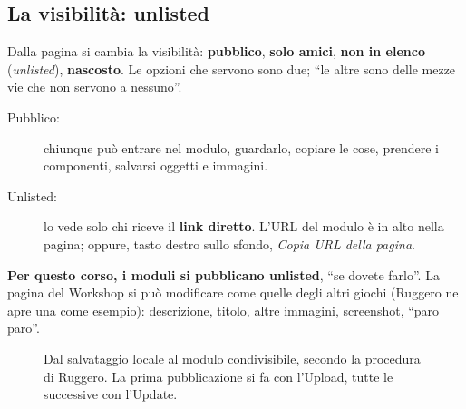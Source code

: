 \subsection{La visibilità: unlisted}
\label{a8:sec:visibilita}

Dalla pagina si cambia la visibilità: \textbf{pubblico}, \textbf{solo amici},
\textbf{non in elenco} (\emph{unlisted}), \textbf{nascosto}. Le opzioni che servono sono
due; ``le altre sono delle mezze vie che non servono a nessuno''.
\begin{description}
  \item[Pubblico:] chiunque può entrare nel modulo, guardarlo, copiare le cose,
        prendere i componenti, salvarsi oggetti e immagini.
  \item[Unlisted:] lo vede solo chi riceve il \textbf{link diretto}. L'URL del modulo
        è in alto nella pagina; oppure, tasto destro sullo sfondo, \emph{Copia URL
        della pagina}.
\end{description}
\textbf{Per questo corso, i moduli si pubblicano unlisted}, ``se dovete farlo''. La
pagina del Workshop si può modificare come quelle degli altri giochi (Ruggero ne apre
una come esempio): descrizione, titolo, altre immagini, screenshot, ``paro paro''.

\begin{figure}[htbp]
\centering
{}
\caption{Dal salvataggio locale al modulo condivisibile, secondo la procedura di
Ruggero. La prima pubblicazione si fa con l'Upload, tutte le successive con l'Update.}
\label{a8:fig:workshop}
\end{figure}


